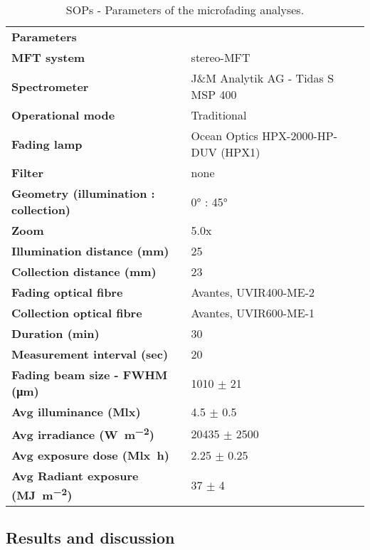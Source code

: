 \begin{table*}[!h]
\centering %
\caption[\hspace{0.3cm}\acrshort{SOP}s - Parameters of the microfading analyses.
]{\gls{SOP}s - Parameters of the microfading analyses.}
\begin{tabular}{L{6cm}L{7cm}}
\toprule[0.4mm]
\textbf{Parameters} &  \\
\textbf{MFT system} & stereo-MFT \\
\textbf{Spectrometer} & J\&M Analytik AG - Tidas S MSP 400 \\
\textbf{Operational mode} & Traditional \\
\textbf{Fading lamp} & Ocean Optics HPX-2000-HP-DUV (HPX1) \\
\textbf{Filter} & none \\
\textbf{Geometry (illumination : collection)} & \ang{0} : \ang{45} \\
\textbf{Zoom} & 5.0x \\
\textbf{Illumination distance (\unit{\milli\metre})} & 25 \\
\textbf{Collection distance (\unit{\milli\metre})} & 23 \\
\textbf{Fading optical fibre} & Avantes, UVIR400-ME-2 \\
\textbf{Collection optical fibre} & Avantes, UVIR600-ME-1 \\
\textbf{Duration (min)} & 30 \\
\textbf{Measurement interval (sec)} & 20 \\
\textbf{Fading beam size - \acrshort{FWHM} (\unit{\um})} & 1010 $\pm$ 21 \\
\textbf{Avg illuminance (\unit{\mega\lux})} & 4.5 $\pm$ 0.5 \\
\textbf{Avg irradiance (\unit{\watt\per\square\metre})} & 20435 $\pm$ 2500 \\
\textbf{Avg exposure dose (\unit{\mega\lux\hour})} & 2.25 $\pm$ 0.25 \\
\textbf{Avg Radiant exposure (\unit{\mega\joule\per\square\metre})} & 37 $\pm$ 4 \\
\bottomrule[0.4mm]
\end{tabular}
\label{tab:SOP_params-MFT}
\end{table*}

\newpage
\subsection{Results and discussion}

